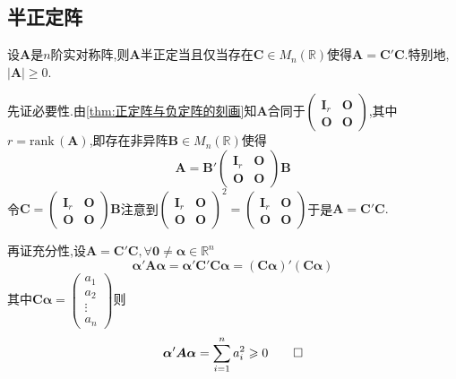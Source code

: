 \subsection{半正定阵}
\begin{green}
    \begin{lemma}[半正定的判定]\label{lem:半正定的判定}
        设$\bm{A}$是$n$阶实对称阵,则$\bm{A}$半正定当且仅当存在$\bm{C}\in M_n\left(\mathbb{R}\right)$使得$\bm{A}=\bm{C}'\bm{C}$.特别地,$\left|\bm{A}\right|\geqslant 0.$
    \end{lemma}
    \begin{Proof}
        先证必要性.由\cref{thm:正定阵与负定阵的刻画}知$\bm{A}$合同于$\begin{pmatrix}
            \bm{I}_r&\bm{O}\\
            \bm{O}&\bm{O}
            \end{pmatrix}$,其中$r=\mathrm{rank}\,\left(\bm{A}\right)$,即存在非异阵$\bm{B}\in M_n\left(\mathbb{R}\right)$使得\[
            \bm{A}=\bm{B}'\begin{pmatrix}
                \bm{I}_r&\bm{O}\\
                \bm{O}&\bm{O}
            \end{pmatrix}\bm{B}
            \]令$\bm{C}=\begin{pmatrix}
                \bm{I}_r&\bm{O}\\
                \bm{O}&\bm{O}
            \end{pmatrix}\bm{B}$注意到$\begin{pmatrix}
                \bm{I}_r&\bm{O}\\
                \bm{O}&\bm{O}
            \end{pmatrix}^2=\begin{pmatrix}
                \bm{I}_r&\bm{O}\\
                \bm{O}&\bm{O}
            \end{pmatrix}$于是$\bm{A}=\bm{C}'\bm{C}.$

            再证充分性,设$\bm{A}=\bm{C}'\bm{C},\forall \bm{0}\neq\bm{\alpha}\in \mathbb{R}^n$\[
            \bm{\alpha}'\bm{A\alpha}=\bm{\alpha}'\bm{C}'\bm{C\alpha}=\left(\bm{C\alpha}\right)'\left(\bm{C\alpha}\right)
            \]其中$\bm{C\alpha}=\begin{pmatrix}
                a_1\\a_2\\\vdots\\a_n
            \end{pmatrix}$则\[
            \bm{\alpha}'\bm{A\alpha}=\sum_{i=1}^{n}a_i^2\geqslant 0\qedhere
            \]
    \end{Proof}
\end{green}
